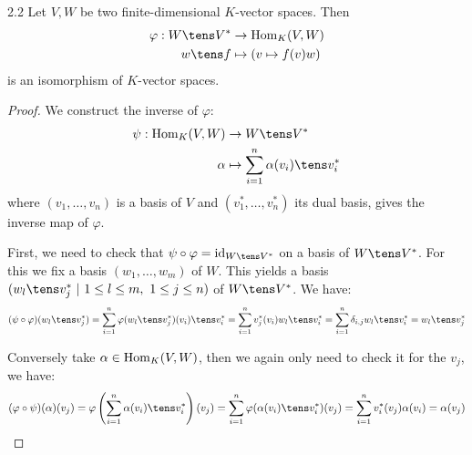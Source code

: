 \documentclass[twoside = false,	%
		headsepline,		%
		parskip = true,
		]{scrbook}						%
\begin{document}
    \begin{proposition}{}{2.2}
        Let $V, W$ be two finite-dimensional $K$-vector spaces. Then
        \begin{equation*}
        \begin{split}
            \varphi: W \tens V^* &\to \Hom_K(V,W) \\
            w \tens f &\mapsto (v \mapsto f(v)w )    
        \end{split}
        \end{equation*}
        is an isomorphism of $K$-vector spaces.
    \end{proposition}
    
    \begin{proof}
        We construct the inverse of $\varphi$:
        \begin{equation*}
        \begin{split}
            \psi: \Hom_K(V,W) &\to W \tens V^* \\
            \alpha &\mapsto \sum_{i=1}^n \alpha(v_i) \tens v_i^*
        \end{split}
        \end{equation*}
        where $(v_1,\dots,v_n)$ is a basis of $V$ and $(v_1^*,\dots,v_n^*)$ its dual basis, gives the inverse map of $\varphi$.
        
        First, we need to check that $\psi \circ \varphi = \id_{W \tens V^*}$ on a basis of $W \tens V^*$. For this we fix a basis $(w_1,\dots,w_m)$ of $W$. This yields a basis $(w_l \tens v_j^*\ | \ 1 \leq l \leq m, \ 1 \leq j \leq n)$ of $W \tens V^*$. We have:
        \begin{equation*}
        \begin{split}
            (\psi \circ \varphi)(w_l \tens v_j^*) = \sum_{i=1}^{n} \varphi(w_l \tens v_j^*)(v_i) \tens v_i^* = \sum_{i=1}^{n} v_j^*(v_i)w_l \tens v_i^* = \sum_{i=1}^n \delta_{i,j} w_l \tens v_i^* = w_l \tens v_j^*
        \end{split}
        \end{equation*}
        
        Conversely take $\alpha \in \mathrm{Hom}_K(V,W)$, then we again only need to check it for the $v_j$, we have:
        \begin{equation*}
        \begin{split}
            (\varphi \circ \psi)(\alpha)(v_j) = \varphi\round{\sum_{i=1}^n \alpha(v_i) \tens v_i^*}(v_j) = \sum_{i=1}^n \varphi(\alpha(v_i) \tens v_i^*)(v_j) = \sum_{i=1}^n v_i^*(v_j)  \alpha(v_i) = \alpha(v_j)
        \end{split}
        \end{equation*}
    \end{proof}
    
\end{document}
